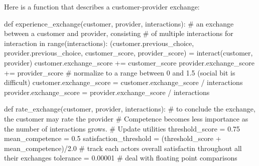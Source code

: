 \documentclass[
  letterpaper,
  DIV=11,
  numbers=noendperiod]{scrartcl}
\newenvironment{Shaded}{\begin{snugshade}}{\end{snugshade}}
\newcommand{\BuiltInTok}[1]{\textcolor[rgb]{0.00,0.23,0.31}{#1}}
\newcommand{\CommentTok}[1]{\textcolor[rgb]{0.37,0.37,0.37}{#1}}
\newcommand{\ControlFlowTok}[1]{\textcolor[rgb]{0.00,0.23,0.31}{#1}}
\newcommand{\FloatTok}[1]{\textcolor[rgb]{0.68,0.00,0.00}{#1}}
\newcommand{\KeywordTok}[1]{\textcolor[rgb]{0.00,0.23,0.31}{#1}}
\newcommand{\NormalTok}[1]{\textcolor[rgb]{0.00,0.23,0.31}{#1}}
\newcommand{\OperatorTok}[1]{\textcolor[rgb]{0.37,0.37,0.37}{#1}}
\begin{document}
Here is a function that describes a customer-provider exchange:

\begin{Shaded}
\begin{Highlighting}[]
\KeywordTok{def}\NormalTok{ experience\_exchange(customer, provider, interactions):}
    \CommentTok{\# an exchange between a customer and provider, consisting}
    \CommentTok{\# of multiple interactions}
    \ControlFlowTok{for}\NormalTok{ interaction }\KeywordTok{in} \BuiltInTok{range}\NormalTok{(interactions):}
\NormalTok{        (customer.previous\_choice, provider.previous\_choice,}
\NormalTok{         customer\_score, provider\_score) }\OperatorTok{=}\NormalTok{ interact(customer, }
\NormalTok{                                                    provider)}
\NormalTok{        customer.exchange\_score }\OperatorTok{+=}\NormalTok{ customer\_score}
\NormalTok{        provider.exchange\_score }\OperatorTok{+=}\NormalTok{ provider\_score}
    \CommentTok{\# normalize to a range between 0 and 1.5 (social bit is difficult)}
\NormalTok{    customer.exchange\_score }\OperatorTok{=}\NormalTok{ customer.exchange\_score }\OperatorTok{/}\NormalTok{ interactions}
\NormalTok{    provider.exchange\_score }\OperatorTok{=}\NormalTok{ provider.exchange\_score }\OperatorTok{/}\NormalTok{ interactions}
    
\KeywordTok{def}\NormalTok{ rate\_exchange(customer, provider, interactions):}
    \CommentTok{\# to conclude the exchange, the customer may rate the provider}
    \CommentTok{\# Competence becomes less importance as the number of interactions grows.}
    \CommentTok{\# Update utilities}
\NormalTok{    threshold\_score }\OperatorTok{=} \FloatTok{0.75}
\NormalTok{    mean\_competence }\OperatorTok{=} \FloatTok{0.5}
\NormalTok{    satisfaction\_threshold }\OperatorTok{=}\NormalTok{ (threshold\_score }\OperatorTok{+}\NormalTok{ mean\_competence)}\OperatorTok{/}\FloatTok{2.0}
    \CommentTok{\# track each actor\textquotesingle{}s overall satisfactin throughout all their exchanges}
\NormalTok{    tolerance }\OperatorTok{=} \FloatTok{0.00001} \CommentTok{\# deal with floating point comparisons}
    

\end{Highlighting}
\end{Shaded}
\end{document}
